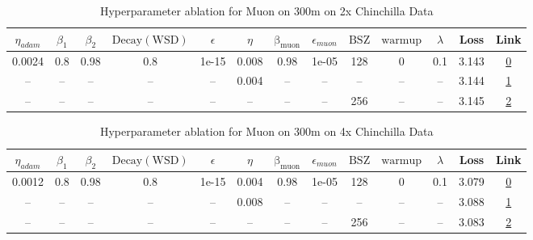 \begin{table}[H]
\centering
\caption{Hyperparameter ablation for Muon on 300m on 2x Chinchilla Data}
\label{tab:ablation_muon_300m_2}
\begin{tabular}{ccccccccccccc}
\toprule
$\eta_{adam}$ & $\beta_1$ & $\beta_2$ & $\mathrm{Decay (WSD)}$ & $\epsilon$ & $\eta$ & $\mathrm{\beta_{muon}}$ & $\epsilon_{muon}$ & $\mathrm{BSZ}$ & $\mathrm{warmup}$ & $\lambda$ & Loss & Link \\
\midrule
0.0024 & 0.8 & 0.98 & 0.8 & 1e-15 & 0.008 & 0.98 & 1e-05 & 128 & 0 & 0.1 & 3.143 & \href{https://wandb.ai/stanford-mercury/optimizer-scaling/runs/sweep-300m-12B-muon5de1eclr0.008-wd0.1-minlr0-warmup0-b10.8-b20.-049a9e}{0} \\
\midrule
-- & -- & -- & -- & -- & 0.004 & -- & -- & -- & -- & -- & 3.144 & \href{https://wandb.ai/stanford-mercury/optimizer-scaling/runs/sweep-300m-12B-muon3a0740lr0.004-wd0.1-minlr0-warmup0-b10.8-b20.-732319}{1} \\
-- & -- & -- & -- & -- & -- & -- & -- & 256 & -- & -- & 3.145 & \href{https://wandb.ai/stanford-mercury/optimizer-scaling/runs/sweep-300m-12B-muon103aa7lr0.008-wd0.1-minlr0-warmup0-b10.8-b20.-2cbfa9}{2} \\
\bottomrule
\end{tabular}
\end{table}

\begin{table}[H]
\centering
\caption{Hyperparameter ablation for Muon on 300m on 4x Chinchilla Data}
\label{tab:ablation_muon_300m_4}
\begin{tabular}{ccccccccccccc}
\toprule
$\eta_{adam}$ & $\beta_1$ & $\beta_2$ & $\mathrm{Decay (WSD)}$ & $\epsilon$ & $\eta$ & $\mathrm{\beta_{muon}}$ & $\epsilon_{muon}$ & $\mathrm{BSZ}$ & $\mathrm{warmup}$ & $\lambda$ & Loss & Link \\
\midrule
0.0012 & 0.8 & 0.98 & 0.8 & 1e-15 & 0.004 & 0.98 & 1e-05 & 128 & 0 & 0.1 & 3.079 & \href{https://wandb.ai/stanford-mercury/optimizer-scaling/runs/sweep-300m-24B-muon25115alr0.004-wd0.1-minlr0-warmup0-b10.8-b20.-f7ddef}{0} \\
\midrule
-- & -- & -- & -- & -- & 0.008 & -- & -- & -- & -- & -- & 3.088 & \href{https://wandb.ai/stanford-mercury/optimizer-scaling/runs/sweep-300m-24B-muond28b65lr0.008-wd0.1-minlr0-warmup0-b10.8-b20.-55461d}{1} \\
-- & -- & -- & -- & -- & -- & -- & -- & 256 & -- & -- & 3.083 & \href{https://wandb.ai/stanford-mercury/optimizer-scaling/runs/sweep-300m-24B-muon3a0740lr0.004-wd0.1-minlr0-warmup0-b10.8-b20.-e71893}{2} \\
\bottomrule
\end{tabular}
\end{table}

